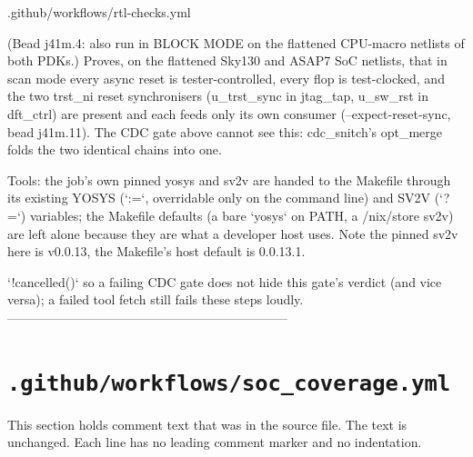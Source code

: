 \begin{relocated}{.github/workflows/rtl-checks.yml}
\begin{textblock}
(Bead j41m.4: also run in BLOCK MODE on the flattened CPU-macro netlists of both PDKs.)
Proves, on the flattened Sky130 and ASAP7 SoC netlists, that in scan mode
every async reset is tester-controlled, every flop is test-clocked, and the
two trst_ni reset synchronisers (u_trst_sync in jtag_tap, u_sw_rst in
dft_ctrl) are present and each feeds only its own consumer
(--expect-reset-sync, bead j41m.11). The CDC gate above cannot see this:
cdc_snitch's opt_merge folds the two identical chains into one.

Tools: the job's own pinned yosys and sv2v are handed to the Makefile through
its existing YOSYS (`:=`, overridable only on the command line) and SV2V
(`?=`) variables; the Makefile defaults (a bare `yosys` on PATH, a /nix/store
sv2v) are left alone because they are what a developer host uses. Note the
pinned sv2v here is v0.0.13, the Makefile's host default is 0.0.13.1.

`!cancelled()` so a failing CDC gate does not hide this gate's verdict (and
vice versa); a failed tool fetch still fails these steps loudly.
------------------------------------------------------------------
\end{textblock}

\end{relocated}

\section{\texttt{.github/workflows/soc\_coverage.yml}}\label{um:flow:ci-soc-coverage}

This section holds comment text that was in the source file. The text is unchanged. Each line has no leading comment marker and no indentation.

